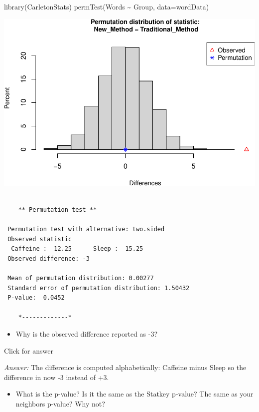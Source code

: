 \documentclass[
]{book}
\newenvironment{Shaded}{\begin{snugshade}}{\end{snugshade}}
\newcommand{\AttributeTok}[1]{\textcolor[rgb]{0.77,0.63,0.00}{#1}}
\newcommand{\FunctionTok}[1]{\textcolor[rgb]{0.00,0.00,0.00}{#1}}
\newcommand{\NormalTok}[1]{#1}
\newcommand{\SpecialCharTok}[1]{\textcolor[rgb]{0.00,0.00,0.00}{#1}}
\providecommand{\tightlist}{%
  \setlength{\itemsep}{0pt}\setlength{\parskip}{0pt}}
\begin{document}
\begin{Shaded}
\begin{Highlighting}[]
\FunctionTok{library}\NormalTok{(CarletonStats)}
\FunctionTok{permTest}\NormalTok{(Words }\SpecialCharTok{\textasciitilde{}}\NormalTok{ Group, }\AttributeTok{data=}\NormalTok{wordData)}
\end{Highlighting}
\end{Shaded}

\includegraphics[width=1\linewidth]{Class_Activity_13_files/figure-latex/unnamed-chunk-2-1}

\begin{verbatim}

    ** Permutation test **

 Permutation test with alternative: two.sided 
 Observed statistic
  Caffeine :  12.25      Sleep :  15.25 
 Observed difference: -3 

 Mean of permutation distribution: 0.00277 
 Standard error of permutation distribution: 1.50432 
 P-value:  0.0452 

    *-------------*
\end{verbatim}

\begin{itemize}
\tightlist
\item
  Why is the observed difference reported as -3?
\end{itemize}

Click for answer

\emph{Answer:} The difference is computed alphabetically: Caffeine minus Sleep so the difference in now -3 instead of +3.

\begin{itemize}
\tightlist
\item
  What is the p-value? Is it the same as the Statkey p-value? The same as your neighbors p-value? Why not?
\end{itemize}
\end{document}

